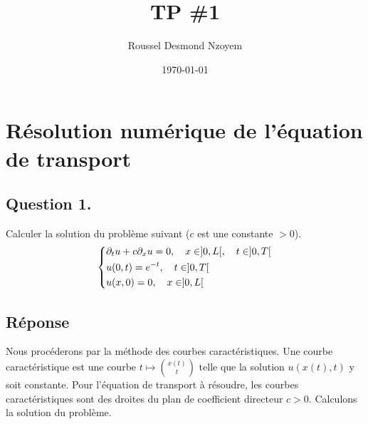 \documentclass[
	french,
	11pt, %
]{fphw}
\title{TP \#1} %
\author{Roussel Desmond Nzoyem} %
\date{\today} %
\institute{Université de Strasbourg \\ UFR de Mathématiques et Informatique} %
\begin{document}
\maketitle %



\section{Résolution numérique de l'équation de transport}

\subsection*{Question 1.}
\begin{problem}
	Calculer la solution du problème suivant ($c$ est une constante $> 0$).
	\begin{align*}
		\begin{dcases}
			\partial_t u + c \partial_x u = 0, \quad x \in ]0, L[, \quad t \in ]0,T[ \\
			u(0, t) = e^{-t}, \quad t \in ]0,T[ \\
			u(x, 0) = 0, \quad x \in ]0,L[
		\end{dcases}
	\end{align*}
\end{problem}


\subsection*{Réponse} 

Nous procéderons par la méthode des courbes caractéristiques. Une courbe caractéristique est une courbe $t \mapsto {x(t) \choose t}$ telle que la solution $u(x(t),t)$ y soit constante. Pour l'équation de transport à résoudre, les courbes caractéristiques sont des droites du plan de coefficient directeur $c > 0$. 
Calculons la solution du problème.
\end{document}
